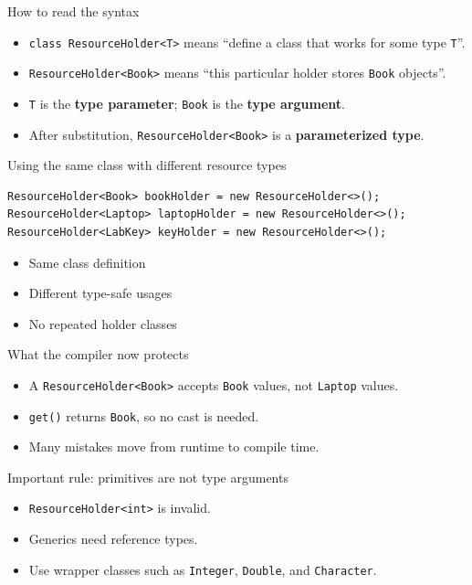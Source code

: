 \documentclass{beamer}
\begin{document}
\begin{frame}{How to read the syntax}
\begin{itemize}[<+->]
  \item \texttt{class ResourceHolder<T>} means ``define a class that works for some type \texttt{T}''.
  \item \texttt{ResourceHolder<Book>} means ``this particular holder stores \texttt{Book} objects''.
  \item \texttt{T} is the \textbf{type parameter}; \texttt{Book} is the \textbf{type argument}.
  \item After substitution, \texttt{ResourceHolder<Book>} is a \textbf{parameterized type}.
\end{itemize}
  \slidesources{\OOPSUnitIVSources}
\end{frame}

\begin{frame}[fragile]{Using the same class with different resource types}
\begin{lstlisting}
ResourceHolder<Book> bookHolder = new ResourceHolder<>();
ResourceHolder<Laptop> laptopHolder = new ResourceHolder<>();
ResourceHolder<LabKey> keyHolder = new ResourceHolder<>();
\end{lstlisting}
\begin{itemize}[<+->]
  \item Same class definition
  \item Different type-safe usages
  \item No repeated holder classes
\end{itemize}
  \slidesources{\OOPSUnitIVSources}
\end{frame}

\begin{frame}{What the compiler now protects}
\begin{itemize}[<+->]
  \item A \texttt{ResourceHolder<Book>} accepts \texttt{Book} values, not \texttt{Laptop} values.
  \item \texttt{get()} returns \texttt{Book}, so no cast is needed.
  \item Many mistakes move from runtime to compile time.
\end{itemize}
  \slidesources{\OOPSUnitIVSources}
\end{frame}

\begin{frame}{Important rule: primitives are not type arguments}
\begin{itemize}[<+->]
  \item \texttt{ResourceHolder<int>} is invalid.
  \item Generics need reference types.
  \item Use wrapper classes such as \texttt{Integer}, \texttt{Double}, and \texttt{Character}.
\end{itemize}
  \slidesources{\OOPSUnitIVSources}
\end{frame}
\end{document}
